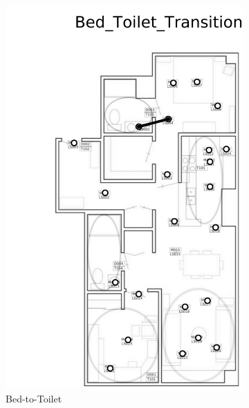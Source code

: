 \documentclass{article}
\begin{document}
\begin{figure}[!b]
\begin{subfigure}{0.32\linewidth}
    \includegraphics[width=\linewidth]{figures/visActs/Bed_Toilet_Transition_bw_cp}
    \caption{Bed-to-Toilet}
\end{subfigure}
\begin{subfigure}{0.32\linewidth}

\end{subfigure}
\end{figure}
\end{document}
